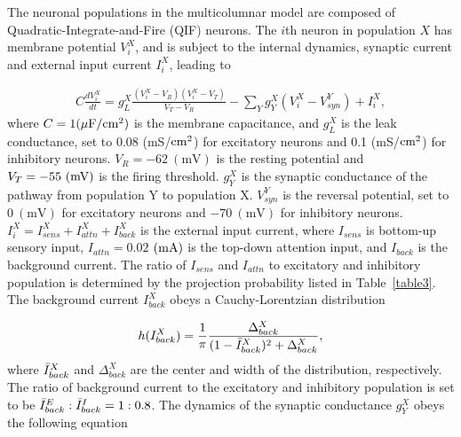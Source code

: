 \documentclass[10pt,letterpaper]{article}
\begin{document}
The neuronal populations in the multicolumnar model are composed of Quadratic-Integrate-and-Fire (QIF) neurons. The $i$th neuron in population $X$ has membrane potential $V_{i}^{X}$, and is subject to the internal dynamics, synaptic current and external input current $I_{i}^{X}$, leading to 

\begin{eqnarray}
\label{eq:1}
    C\frac{dV_{i}^{X}}{dt} = g_{L}^{X}\frac{(V_{i}^{X}-V_{R})(V_{i}^{X}-V_{T})}{V_{T}-V_{R}}-\sum_{Y}g_{Y}^{X}(V_{i}^{X}-V_{syn}^{Y}) + I_{i}^{X},
\end{eqnarray}
where $C=1(\rm \mu F/cm^2)$ is the membrane capacitance, and $g_{L}^{X}$ is the leak conductance, set to 0.08 (mS/$\rm cm^{2}$) for excitatory neurons and 0.1 (mS/$\rm cm^{2}$) for inhibitory neurons. $V_{R}=-62\ \mathrm{(mV)}$ is the resting potential and $V_{T}=-55\ (\rm mV)$ is the firing threshold. $g_{Y}^{X}$ is the synaptic conductance of the pathway from population Y to population X. $V_{syn}^{Y}$ is the reversal potential, set to  $0\ \mathrm{(mV)}$ for excitatory neurons and $-70\ \mathrm{(mV)}$ for inhibitory neurons. $I_{i}^{X}=I_{sens}^{X} + I_{attn}^{X} + I_{back}^{X}$ is the external input current, where $I_{sens}$ is bottom-up sensory input, $I_{attn}=0.02$ $(\rm mA)$ is the top-down attention input, and $I_{back}$ is the background current. The ratio of $I_{sens}$ and $I_{attn}$ to excitatory and inhibitory population is determined by the projection probability listed in Table~\ref{table3}. The background current $I_{back}^{X}$ obeys a Cauchy-Lorentzian distribution

\begin{eqnarray}
\label{eq:2}
        h(I_{back}^{X}) = \frac{1}{\pi}\frac{\Delta_{back}^{X}}{(1-\Bar{I}_{back}^{X})^{2}+\Delta_{back}^{X}},
\end{eqnarray}
where $\Bar{I}_{back}^{X}$ and $\Delta_{back}^{X}$ are the center and width of the distribution, respectively. The ratio of background current to the excitatory and inhibitory population is set to be $\Bar{I}_{back}^{E} : \Bar{I}_{back}^{I} = 1:0.8$. The dynamics of the synaptic conductance $g_{Y}^{X}$ obeys the following equation
\end{document}
